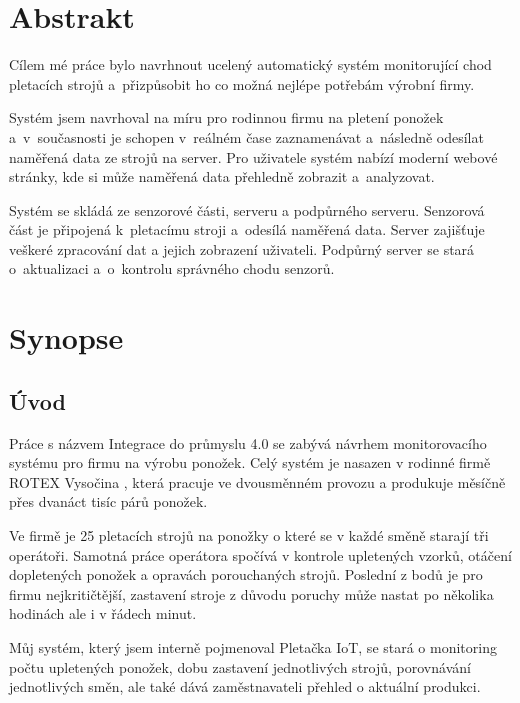 \documentclass{template/socthesis}
\begin{document}


\chapter{Abstrakt}

Cílem mé práce bylo navrhnout ucelený automatický systém monitorující chod pletacích strojů a~přizpůsobit ho co možná nejlépe potřebám výrobní firmy.

Systém jsem navrhoval na míru pro rodinnou firmu na pletení ponožek a~v sou\-čas\-nos\-ti je schopen v~reálném čase zaznamenávat a~následně odesílat naměřená data ze strojů na server. 
Pro uživatele systém nabízí moderní webové stránky, kde si může naměřená data přehledně zobrazit a~analyzovat.

Systém se skládá ze senzorové části, serveru a podpůrného serveru.
Senzorová část je připojená k~pletacímu stroji a~odesílá naměřená data.
Server zajišťuje veškeré zpracování dat a jejich zobrazení uživateli.
Podpůrný server se stará o~aktualizaci a~o~kontrolu správného chodu senzorů.


\chapter{Synopse}

\section{Úvod}
Práce s názvem Integrace do průmyslu 4.0 se zabývá návrhem monitorovacího systému pro firmu na výrobu ponožek.
Celý systém je nasazen v rodinné firmě ROTEX Vysočina \cite{ROTEX}, která pracuje ve dvousměnném provozu a produkuje měsíčně přes dvanáct tisíc párů ponožek.

Ve firmě je 25 pletacích strojů na ponožky o které se v každé směně starají tři operátoři.
Samotná práce operátora spočívá v kontrole upletených vzorků, otáčení dopletených ponožek a opravách porouchaných strojů.
Poslední z bodů je pro firmu nejkritičtější, zastavení stroje z důvodu poruchy může nastat po několika hodinách ale i v řádech minut.

Můj systém, který jsem interně pojmenoval Pletačka IoT, se stará o monitoring počtu upletených ponožek, dobu zastavení jednotlivých strojů, porovnávání jednotlivých směn, ale také dává zaměstnavateli přehled o aktuální produkci.
\end{document}
